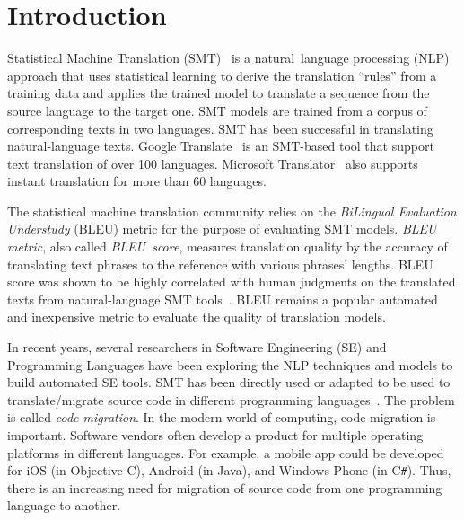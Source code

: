 \section{Introduction}
\label{sec:intro}

Statistical Machine Translation (SMT)~\cite{smtbook} is a
natural~language processing (NLP) approach that uses statistical
learning to derive the translation ``rules'' from a training data and
applies the trained model to translate a sequence from the source
language to the target one.
SMT models are trained from a corpus of corresponding texts in two
languages. SMT has been successful in translating natural-language
texts.  Google Translate~\cite{googletranslate} is an SMT-based
tool that support text translation of over 100
languages. Microsoft Translator~\cite{mstranslator} also supports
instant translation for more than 60 languages.

The statistical machine translation community relies on the {\em
  BiLingual Evaluation Understudy} (BLEU) metric for the purpose of
evaluating SMT models. {\em BLEU metric}, also called {\em
  BLEU~score}, measures translation quality by the accuracy of
translating text phrases to the reference with various phrases'
lengths. BLEU score was shown to be highly correlated with human judgments
on the translated texts from natural-language SMT
tools~\cite{Papineni2002}.
%
BLEU remains a popular automated and inexpensive
metric to evaluate the quality of translation models.



In recent years, several researchers in Software Engineering (SE) and
Programming Languages have been exploring the NLP techniques and
models to build automated SE tools. SMT has been directly used or
adapted to be used to translate/migrate source code in different
programming
languages~\cite{fse13-nier,icse14-demo,karaivanov14,ase15,icsme16}. The
problem is called {\em code migration}. In the modern world of
computing, code migration is important. Software vendors often develop
a product for multiple operating platforms in different languages. For
example, a mobile app could be developed for iOS (in Objective-C),
Android (in Java), and Windows Phone (in C\texttt{\#}).
Thus, there is an increasing need for migration of source code from
one programming language to another.
%

